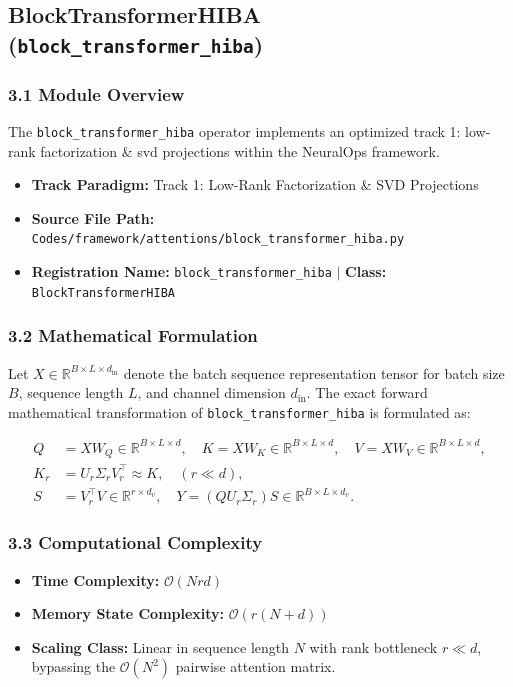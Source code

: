 \subsection{BlockTransformerHIBA (\texttt{block\_transformer\_hiba})}
\label{sec:app_module_block_transformer_hiba}

\subsubsection*{3.1 Module Overview}
The \texttt{block\_transformer\_hiba} operator implements an optimized track 1: low-rank factorization \& svd projections within the NeuralOps framework.
\begin{itemize}
    \item \textbf{Track Paradigm:} Track 1: Low-Rank Factorization \& SVD Projections
    \item \textbf{Source File Path:} \texttt{Codes/framework/attentions/block\_transformer\_hiba.py}
    \item \textbf{Registration Name:} \texttt{block\_transformer\_hiba} $\mid$ \textbf{Class:} \texttt{BlockTransformerHIBA}
\end{itemize}

\subsubsection*{3.2 Mathematical Formulation}
Let $X \in \mathbb{R}^{B \times L \times d_{\text{in}}}$ denote the batch sequence representation tensor for batch size $B$, sequence length $L$, and channel dimension $d_{\text{in}}$. The exact forward mathematical transformation of \texttt{block\_transformer\_hiba} is formulated as:

\begin{align}
Q &= X W_Q \in \mathbb{R}^{B \times L \times d}, \quad K = X W_K \in \mathbb{R}^{B \times L \times d}, \quad V = X W_V \in \mathbb{R}^{B \times L \times d}, \\
K_r &= U_r \Sigma_r V_r^\top \approx K, \quad (r \ll d), \\
S &= V_r^\top V \in \mathbb{R}^{r \times d_v}, \quad Y = (Q U_r \Sigma_r) S \in \mathbb{R}^{B \times L \times d_v}.
\end{align}


\subsubsection*{3.3 Computational Complexity}
\begin{itemize}
    \item \textbf{Time Complexity:} $\mathcal{O}(N r d)$
    \item \textbf{Memory State Complexity:} $\mathcal{O}(r(N + d))$
    \item \textbf{Scaling Class:} Linear in sequence length $N$ with rank bottleneck $r \ll d$, bypassing the $\mathcal{O}(N^2)$ pairwise attention matrix.
\end{itemize}

